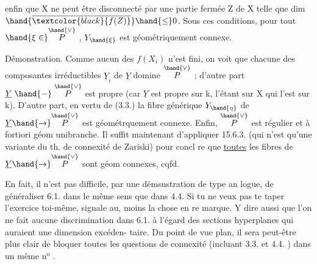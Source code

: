 enfin que X ne peut être disconnecté par une partie fermée Z de X telle
que dim $\hand{\overline{\textcolor{black}{f(Z)}}} \hand{\leq} 0$.    Sous ces conditions, pour tout $\hand{\xi \in} \overset{\hand{\vee}}{P}$ , $Y_{\hand{\xi}}$ est
géométriquement connexe.

Démonstration.  Comme  aucun des $f(X_i)$ n'est fini, on voit
que chacune des composantes irréductibles $\underline{Y}_i$ de $\underline{Y}$ domine $\overset{\hand{\vee}}{P}$ ;
d'autre part $\underline{Y} \mathrel{\hand{-}} \overset{\hand{\vee}}{P}$ est propre (car $\underline{Y}$ est propre sur k, l'étant sur X
qui l'est sur k).  D'autre part, en vertu de (3.3.) la fibre générique
$Y_{\hand{\eta}}$ de $\underline{Y} \hand{\to} \overset{\hand{\vee}}{P}$ est géométrquement connexe. Enfin, $\overset{\hand{\vee}}{P}$ est régulier et
à fortiori géom unibranche. Il suffit maintenant d'appliquer 15.6.3.
(qui n'est qu'une variante du th. de connexité  de Zariski) pour concl
re que \uline{toutes} les fibres  de $\underline{Y} \hand{\to} \overset{\hand{\vee}}{P}$ sont géom connexes, cqfd.

\placedmargin{$|$} En fait,  il n'est pas difficile, par une démsnstration de type an
logue, de généraliser 6.1. dans le même sens que dans 4.4. Si tu ne
veux pas te taper l'exercice toi-même, signale au, moins la chose en re
marque. Y dire aussi que l'on ne fait aucune discrimination dans 6.1.
à l'égard des sections hyperplanes qui auraient une dimension excéden-%
\placedmargin{$|$} taire.  Du point de vue plan, il sera peut-être plus clair de bloquer
toutes les questions de connexité (incluant 3.3. et 4.4. ) dans un
même n$^{\text{o}}$ .

